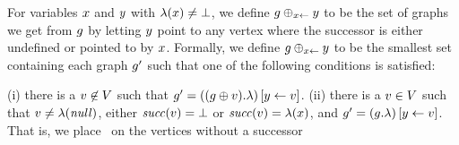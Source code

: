 \begin{graphop}[$\graph\addVarAsPredOf{\xvar}{\yvar}$]
  For variables $x$ and $y$ with $\lambda(x)\neq\bot$,
  we define $\graph\addVarAsPredOf{\xvar}{\yvar}$ to be the set of
  graphs we get from $g$ by letting $y$ point to any
  vertex %
  where the successor %
  is either undefined or pointed to by $x$.
  Formally, we define $\graph\addVarAsPredOf{\xvar}{\yvar}$ to be the
  smallest set containing each graph $g'$ such that one of the
  following conditions is satisfied:
(i) \label{addVarAsPred1}%
    there is a $v\not\in V$ such that
    $g'=\left((g\oplus{\ensuremath{v}}).\lambda\right)\left[y\leftarrow v\right]$.
(ii) \label{addVarAsPred2}%
    there is a $v\in V$ such that
    $v\neq\lambda({\it null})$, either ${\it succ}(v)=\bot$ or
    ${\it succ}(v)=\lambda(x)$, and
    $g'=\left(g.\lambda\right)\left[y\leftarrow v\right]$.
    That is, we place \yvar\ on the vertices without a successor

\end{graphop}
